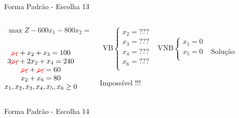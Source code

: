 \documentclass{beamer}
\begin{document}
\begin{frame}
{\begin{block}{Forma Padrão - {\color{cyan}Escolha 13}}
			\begin{columns}
				\begin{column}{0.35\textwidth}
					$
						\begin{matrix}
							\max Z - 600x_1 - 800x_2 = 0 \\
						\end{matrix}
					$ \\
					 \\
					$
						\begin{matrix}
							{\color{red}\cancel{x_1}}  + x_2  + x_3                   = 100 \\
							3{\color{red}\cancel{x_1}} + 2x_2       + x_4             = 240 \\
							{\color{red}\cancel{x_1}}                     + {\color{red}\cancel{x_5}}       = 60 \\
							x_2                           + x_6 = 80 \\
							x_1,x_2, x_3, x_4, x_5, x_6 \ge 0 \\
						\end{matrix}
					$
				\end{column}
				\vline
				\hspace{0.1cm}
				\begin{column}{0.45\textwidth}
						$
							\begin{matrix}
								\text{VB} \left\{  \begin{matrix}
																 x_2 = \text{???} \\
																 x_3 = \text{???} \\
																 x_4 = \text{???} \\
																 x_6 = \text{???} \\
												   \end{matrix} 
										   \right.
								&
								\text{VNB} \left\{  \begin{matrix}
																 x_1 = 0 \\
																 x_5 = 0 \\
												   \end{matrix} 
										   \right. 
								\\
							 & \\
							\end{matrix}
						$
						{\color{red}Solução Impossível !!!}
				\end{column}
			\end{columns}
		\end{block}
	}
	{
		\begin{block}{Forma Padrão - {\color{cyan}Escolha 14}}

\end{block}}
\end{frame}
\end{document}
